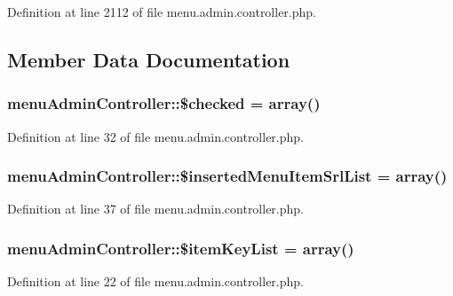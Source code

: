 Definition at line 2112 of file menu.\-admin.\-controller.\-php.



\subsection{Member Data Documentation}
\hypertarget{classmenuAdminController_a37ff2e21ee9beb6c2b762bb36b7e4d69}{
\subsubsection[{\$checked}]{\setlength{\rightskip}{0pt plus 5cm}menu\-Admin\-Controller\-::\$checked = array()}}\label{classmenuAdminController_a37ff2e21ee9beb6c2b762bb36b7e4d69}


Definition at line 32 of file menu.\-admin.\-controller.\-php.

\hypertarget{classmenuAdminController_a4b64a6e1711227dce12e508d4eb3c861}{
\subsubsection[{\$inserted\-Menu\-Item\-Srl\-List}]{\setlength{\rightskip}{0pt plus 5cm}menu\-Admin\-Controller\-::\$inserted\-Menu\-Item\-Srl\-List = array()}}\label{classmenuAdminController_a4b64a6e1711227dce12e508d4eb3c861}


Definition at line 37 of file menu.\-admin.\-controller.\-php.

\hypertarget{classmenuAdminController_a776db5a961d918ad97f1c6ce7b34fc07}{
\subsubsection[{\$item\-Key\-List}]{\setlength{\rightskip}{0pt plus 5cm}menu\-Admin\-Controller\-::\$item\-Key\-List = array()}}\label{classmenuAdminController_a776db5a961d918ad97f1c6ce7b34fc07}


Definition at line 22 of file menu.\-admin.\-controller.\-php.

